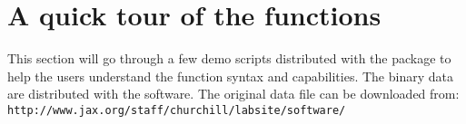 \newpage

\section{A quick tour of the functions}
This section will go through a few demo scripts 
distributed with the package to help the users 
understand the function syntax and capabilities. 
The binary data are distributed with the software. 
The original data file can be 
downloaded from: \\
{\tt http://www.jax.org/staff/churchill/labsite/software/}

